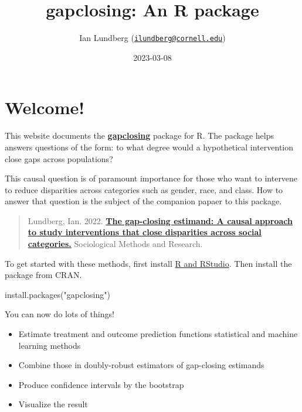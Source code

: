 \documentclass[
]{article}
\title{gapclosing: An R package}
\author{Ian Lundberg (\href{mailto:ilundberg@cornell.edu}{\nolinkurl{ilundberg@cornell.edu}})}
\date{2023-03-08}
\newenvironment{Shaded}{\begin{snugshade}}{\end{snugshade}}
\newcommand{\FunctionTok}[1]{\textcolor[rgb]{0.00,0.00,0.00}{#1}}
\newcommand{\NormalTok}[1]{#1}
\newcommand{\StringTok}[1]{\textcolor[rgb]{0.31,0.60,0.02}{#1}}
\providecommand{\tightlist}{%
  \setlength{\itemsep}{0pt}\setlength{\parskip}{0pt}}
\begin{document}
\maketitle

{
\setcounter{tocdepth}{2}
\tableofcontents
}
\hypertarget{welcome}{%
\section*{Welcome!}\label{welcome}}

This website documents the \href{https://cran.r-project.org/web/packages/gapclosing/}{\textbf{gapclosing}} package for R. The package helps answers questions of the form: to what degree would a hypothetical intervention close gaps across populations?

This causal question is of paramount importance for those who want to intervene to reduce disparities across categories such as gender, race, and class. How to answer that question is the subject of the companion papaer to this package.

\begin{quote}
Lundberg, Ian. 2022. \href{https://doi.org/10.1177/00491241211055769}{\textbf{The gap-closing estimand: A causal approach to study interventions that close disparities across social categories.}} Sociological Methods and Research.
\end{quote}

To get started with these methods, first install \href{https://rstudio-education.github.io/hopr/starting.html}{R and RStudio}. Then install the package from CRAN.

\begin{Shaded}
\begin{Highlighting}[]
\FunctionTok{install.packages}\NormalTok{(}\StringTok{"gapclosing"}\NormalTok{)}
\end{Highlighting}
\end{Shaded}

You can now do lots of things!

\begin{itemize}
\tightlist
\item
  Estimate treatment and outcome prediction functions statistical and machine learning methods
\item
  Combine those in doubly-robust estimators of gap-closing estimands
\item
  Produce confidence intervals by the bootstrap
\item
  Visualize the result
\end{itemize}
\end{document}
